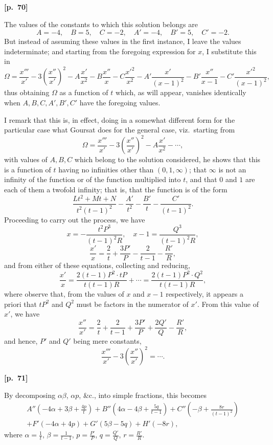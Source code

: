 \documentclass[11pt,a4paper]{article}
\theoremstyle{plain}
\begin{document}
\vspace{0.5em}
\noindent\textbf{[p.\ 70]}

The values of the constants to which this solution belongs are
$$
A = -4, \quad B = 5, \quad C = -2, \quad A' = -4, \quad B' = 5, \quad C' = -2.
$$
But instead of assuming these values in the first instance, I leave the values indeterminate; and starting from the foregoing expression for $x$, I substitute this in
$$
\Omega = \frac{x'''}{x'} - 3\left(\frac{x''}{x'}\right)^2 - A \frac{x'}{x^2} - B \frac{x''}{x} - C \frac{x'^2}{x^2} - A' \frac{x'}{(x - 1)^2} - B' \frac{x''}{x - 1} - C' \frac{x'^2}{(x - 1)^2},
$$
thus obtaining $\Omega$ as a function of $t$ which, as will appear, vanishes identically when $A, B, C, A', B', C'$ have the foregoing values.

I remark that this is, in effect, doing in a somewhat different form for the particular case what Goursat does for the general case, viz.\ starting from
$$
\Omega = \frac{x'''}{x'} - 3\left(\frac{x''}{x'}\right)^2 - A \frac{x'}{x^2} - \cdots,
$$
with values of $A, B, C$ which belong to the solution considered, he shows that this is a function of $t$ having no infinities other than $(0, 1, \infty)$; that $\infty$ is not an infinity of the function or of the function multiplied into $t$, and that $0$ and $1$ are each of them a twofold infinity; that is, that the function is of the form
$$
\frac{Lt^2 + Mt + N}{t^2(t - 1)^2} - \frac{A'}{t^2} - \frac{B'}{t} - \frac{C'}{(t - 1)^2}.
$$
Proceeding to carry out the process, we have
$$
x = -\frac{t^2 P^3}{(t - 1)^2 R}, \quad x - 1 = \frac{Q^3}{(t - 1)^2 R},
$$
$$
\frac{x'}{x} = \frac{2}{t} + \frac{3P'}{P} - \frac{2}{t - 1} - \frac{R'}{R},
$$
and from either of these equations, collecting and reducing,
$$
\frac{x'}{x} = \frac{2(t - 1)P^2 \cdot tP}{t(t - 1)R} + \cdots = \frac{2(t - 1)P^2 \cdot Q^2}{t(t - 1)R},
$$
where observe that, from the values of $x$ and $x - 1$ respectively, it appears a priori that $tP^2$ and $Q^2$ must be factors in the numerator of $x'$. From this value of $x'$, we have
$$
\frac{x''}{x'} = \frac{2}{t} + \frac{2}{t - 1} + \frac{3P'}{P} + \frac{2Q'}{Q} - \frac{R'}{R},
$$
and hence, $P'$ and $Q'$ being mere constants,
$$
\frac{x'''}{x'} - 3\left(\frac{x''}{x'}\right)^2 = \cdots.
$$

\vspace{0.5em}
\noindent\textbf{[p.\ 71]}

By decomposing $\alpha\beta$, $\alpha p$, \&c., into simple fractions, this becomes
\begin{multline*}
A''\left(-4\alpha + 3\beta + \frac{4p}{t}\right) + B''\left(4\alpha - 4\beta + \frac{5q}{t - 1}\right) + C''\left(-\beta + \frac{8r}{(t - 1)^2}\right) \\
+ F'(-4\alpha + 4p) + G'(5\beta - 5q) + H'(-8r),
\end{multline*}
where $\alpha = \frac{1}{t}$, $\beta = \frac{1}{t - 1}$, $p = \frac{P'}{P}$, $q = \frac{Q'}{Q}$, $r = \frac{R'}{R}$.
\end{document}
